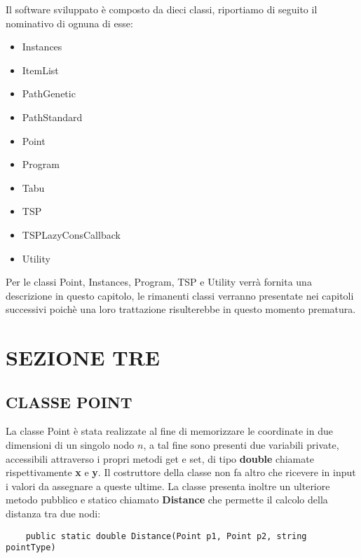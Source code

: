 \documentclass[11pt]{article}
\begin{document}
Il software sviluppato è composto da dieci classi, riportiamo di seguito il nominativo di ognuna di esse:

\begin{itemize}
\item Instances
\item ItemList
\item PathGenetic
\item PathStandard
\item Point
\item Program
\item Tabu
\item TSP
\item TSPLazyConsCallback
\item Utility
\end{itemize}

Per le classi Point, Instances, Program, TSP e Utility verrà fornita una descrizione in questo capitolo, le rimanenti classi verranno presentate nei capitoli successivi poichè una loro trattazione risulterebbe in questo momento prematura. 

\section*{SEZIONE TRE}
\label{sec:SezioneTreS}

\subsection*{CLASSE POINT}
\label{sec:ClassePointS}

La classe Point è stata realizzate al fine di memorizzare le coordinate in due dimensioni di un singolo nodo $n$, a tal fine sono presenti due variabili private, accessibili attraverso i propri metodi get e set, di tipo \textbf{double} chiamate rispettivamente \textbf{x} e \textbf{y}. Il costruttore della classe non fa altro che ricevere in input i valori da assegnare a queste ultime. La classe presenta inoltre un ulteriore metodo pubblico e statico chiamato \textbf{Distance} che permette il calcolo della distanza tra due nodi:

\begin{lstlisting}
    public static double Distance(Point p1, Point p2, string pointType)
\end{lstlisting}
\end{document}
